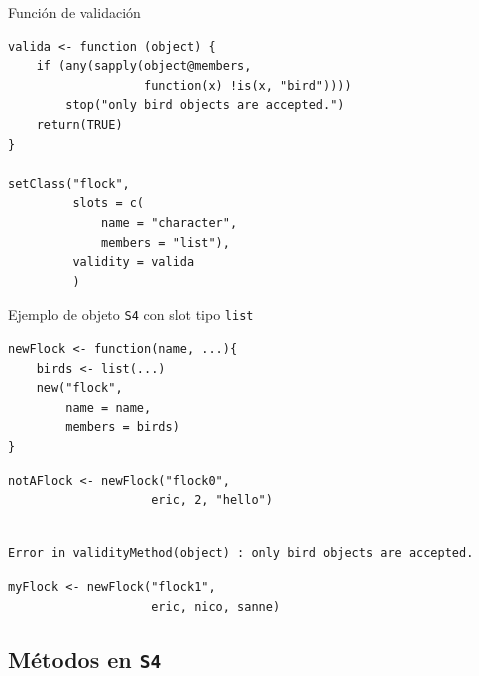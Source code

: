 \documentclass[xcolor={usenames,svgnames,dvipsnames}]{beamer}
\begin{document}
\begin{frame}[label={sec:org8c04639},fragile]{Función de validación}
 \lstset{language=r,label= ,caption= ,captionpos=b,numbers=none}
\begin{lstlisting}
valida <- function (object) {
    if (any(sapply(object@members,
                   function(x) !is(x, "bird")))) 
        stop("only bird objects are accepted.")
    return(TRUE)
}

setClass("flock",
         slots = c(
             name = "character",
             members = "list"),
         validity = valida
         )
\end{lstlisting}
\end{frame}

\begin{frame}[label={sec:org26fe4b2},fragile]{Ejemplo de objeto \texttt{S4} con slot tipo \texttt{list}}
 \lstset{language=r,label= ,caption= ,captionpos=b,numbers=none}
\begin{lstlisting}
newFlock <- function(name, ...){
    birds <- list(...)
    new("flock",
        name = name,
        members = birds)
}
\end{lstlisting}

\lstset{language=r,label= ,caption= ,captionpos=b,numbers=none}
\begin{lstlisting}
notAFlock <- newFlock("flock0",
                    eric, 2, "hello")
\end{lstlisting}

\begin{verbatim}

Error in validityMethod(object) : only bird objects are accepted.
\end{verbatim}


\lstset{language=r,label= ,caption= ,captionpos=b,numbers=none}
\begin{lstlisting}
myFlock <- newFlock("flock1",
                    eric, nico, sanne)
\end{lstlisting}
\end{frame}

\subsection{Métodos en \texttt{S4}}
\label{sec:orgb1fbb24}
\end{document}

